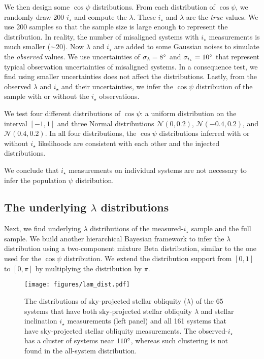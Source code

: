 \documentclass[twocolumn,times]{aastex631}
\newcommand{\numistar}{65\xspace}
\newcommand{\numall}{161\xspace}
\begin{document}
We then design some $\cos{\psi}$ distributions. From each distribution of $\cos{\psi}$, we randomly draw 200 $i_\star$ and compute the $\lambda$. These $i_\star$ and $\lambda$ are the \emph{true} values. We use 200 samples so that the sample size is large enough to represent the distribution. In reality, the number of misaligned systems with $i_\star$ measurements is much smaller ($\sim 20$).
Now $\lambda$ and $i_\star$ are added to some Gaussian noises to simulate the \emph{observed} values. We use uncertainties of $\sigma_{\lambda} = 8\mbox{$^\circ$}$ and $\sigma_{i_\star} = 10\mbox{$^\circ$}$ that represent typical observation uncertainties of misaligned systems. In a consequence test, we find using smaller uncertainties does not affect the distributions.
Lastly, from the observed $\lambda$ and $i_\star$ and their uncertainties, we infer the $\cos{\psi}$ distribution of the sample with or without the $i_\star$ observations.

We test four different distributions of $\cos{\psi}$: a uniform distribution on the interval $[-1,1]$ and three Normal distributions $\mathcal{N}(0,0.2)$, $\mathcal{N}(-0.4,0.2)$, and $\mathcal{N}(0.4,0.2)$.
In all four distributions, the $\cos{\psi}$ distributions inferred with or without $i_\star$ likelihoods are consistent with each other and the injected distributions. 

We conclude that $i_\star$ measurements on individual systems are not necessary to infer the population $\psi$ distribution.

\subsection{The underlying \texorpdfstring{$\lambda$}{lambda} distributions}

Next, we find underlying $\lambda$ distributions of the measured-$i_\star$ sample and the full sample. We build another hierarchical Bayesian framework to infer the $\lambda$ distribution using a two-component mixture Beta distribution, similar to the one used for the $\cos{\psi}$ distribution. We extend the distribution support from $[0,1]$ to $[0,\pi]$ by multiplying the distribution by $\pi$.

\begin{figure*}
    \begin{centering}
        \texttt{[image: figures/lam\_dist.pdf]}
        \caption{The distributions of sky-projected stellar obliquity ($\lambda$) of the \numistar systems that have both sky-projected stellar obliquity $\lambda$ and stellar inclination $i_\star$ measurements (left panel) and all \numall systems that have sky-projected stellar obliquity measurements. The observed-$i_\star$ has a cluster of systems near $110\mbox{$^\circ$}$, whereas such clustering is not found in the all-system distribution.}
        \label{fig:lam_dist}
    \end{centering}
\end{figure*}
\end{document}
